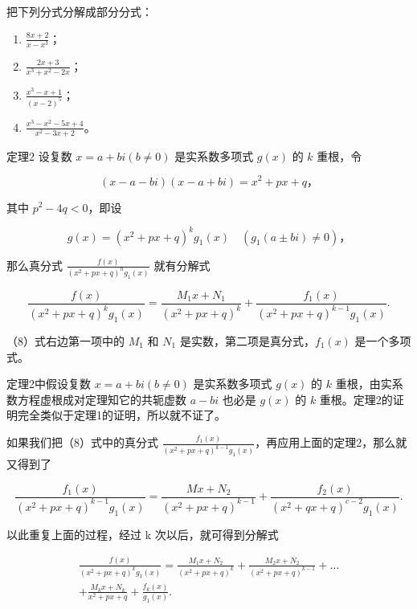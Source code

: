 把下列分式分解成部分分式：

\begin{enumerate}
\item
  \(\frac{8x + 2}{x - x^3}\)；
\item
  \(\frac{2x + 3}{x^3 + x^2 - 2x}\)；
\item
  \(\frac{x^3 - x + 1}{(x - 2)^5}\)；
\item
  \(\frac{x^3 - x^2 - 5x + 4}{x^2 - 3x + 2}\)。
\end{enumerate}

定理2 设复数 \(x = a + bi (b \neq 0)\) 是实系数多项式 \(g(x)\) 的 \(k\)
重根，令

\[
(x - a - b i) (x - a + b i) = x ^ {2} + p x + q\text{，}
\]

其中 \(p^2 - 4q < 0\)，即设

\[
g (x) = \left(x ^ {2} + p x + q\right) ^ {k} g _ {1} (x) \quad \left(g _ {1} (a \pm b i) \neq 0\right)\text{，}
\]

那么真分式 \(\frac{f(x)}{(x^2 + px + q)^n g_1(x)}\) 就有分解式

\[
\frac {f (x)}{\left(x ^ {2} + p x + q\right) ^ {k} g _ {1} (x)} = \frac {M _ {1} x + N _ {1}}{\left(x ^ {2} + p x + q\right) ^ {k}} + \frac {f _ {1} (x)}{\left(x ^ {2} + p x + q\right) ^ {k - 1} g _ {1} (x)}. \tag {8}
\]

（8）式右边第一项中的 \(M_{1}\) 和 \(N_{1}\)
是实数，第二项是真分式，\(f_{1}(x)\) 是一个多项式。

定理2中假设复数 \(x = a + bi (b \neq 0)\) 是实系数多项式 \(g(x)\) 的
\(k\) 重根，由实系数方程虚根成对定理知它的共轭虚数 \(a - bi\) 也必是
\(g(x)\) 的 \(k\) 重根。定理2的证明完全类似于定理1的证明，所以就不证了。

如果我们把（8）式中的真分式
\(\frac{f_1(x)}{(x^2 + px + q)^{k - 1}g_1(x)}\)，再应用上面的定理2，那么就又得到了

\[
\frac {f _ {1} (x)}{(x ^ {2} + p x + q) ^ {k - 1} g _ {1} (x)} = \frac {M x + N _ {2}}{(x ^ {2} + p x + q) ^ {k - 1}} + \frac {f _ {2} (x)}{(x ^ {2} + q x + q) ^ {c - 2} g _ {1} (x)}.
\]

以此重复上面的过程，经过 k 次以后，就可得到分解式

\[
\begin{array}{l} \frac {f (x)}{(x ^ {2} + p x + q) ^ {k} g _ {1} (x)} = \frac {M _ {1} x + N _ {2}}{(x ^ {2} + p x + q) ^ {k}} + \frac {M _ {2} x + N _ {2}}{(x ^ {2} + p x + q) ^ {k - 1}} + \dots \\ + \frac {M _ {k} x + N _ {k}}{x ^ {2} + p x + q} + \frac {f _ {k} (x)}{g _ {1} (x)}. \tag {9} \\ \end{array}
\]

